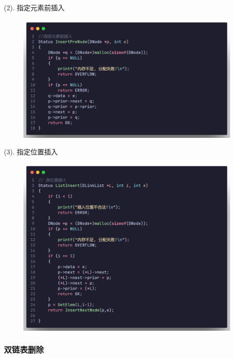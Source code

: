 (2). 指定元素前插入

\begin{figure}[H]
    \centering
    \includegraphics[scale=0.2]{"figure/Note/LinearList/DlFInsert.png"}
\end{figure}

(3). 指定位置插入

\begin{figure}[H]
    \centering
    \includegraphics[scale=0.2]{"figure/Note/LinearList/DlInsert.png"}
\end{figure}


\subsubsection{双链表删除}

